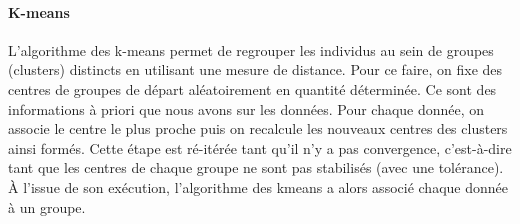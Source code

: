 \documentclass[../thesis.tex]{subfiles}
\begin{document}
    
    \paragraph{K-means} L'algorithme des k-means permet de regrouper les individus au sein de groupes (clusters) distincts en utilisant une mesure de distance. Pour ce faire, on fixe des centres de groupes de départ aléatoirement en quantité déterminée. Ce sont des informations à priori que nous avons sur les données. Pour chaque donnée, on associe le centre le plus proche puis on recalcule les nouveaux centres des clusters ainsi formés. Cette étape est ré-itérée tant qu'il n'y a pas convergence, c'est-à-dire tant que les centres de chaque groupe ne sont pas stabilisés (avec une tolérance). À l'issue de son exécution, l'algorithme des kmeans a alors associé chaque donnée à un groupe.
    
\end{document}
